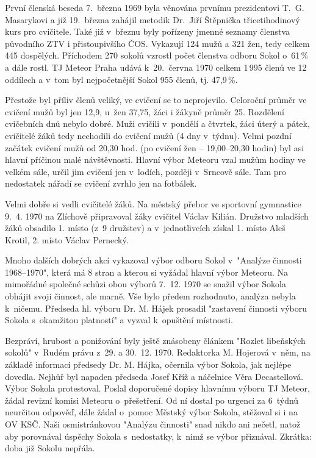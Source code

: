 \documentclass[a5paper, 11pt, twoside]{article}
\begin{document}
\smallskip

První členská beseda 7.~března 1969 byla věnována prvnímu prezidentovi
T.~G. Masarykovi a již 19.~března zahájil metodik Dr.~Jiří Štěpnička
třicetihodinový kurs pro cvičitele. Také již v~březnu byly pořízeny
jmenné seznamy členstva původního ZTV i přistoupivšího ČOS. Vykazují 124
mužů a 321 žen, tedy celkem 445 dospělých. Příchodem 270 sokolů vzrostl
počet členstva odboru Sokol o~61\,\% a dále rostl. TJ Meteor Praha udává
k~20.~června 1970 celkem 1\,995 členů ve 12 oddílech a v~tom byl
nejpočetnější Sokol 955 členů, tj. 47,9\,\%.

Přestože byl příliv členů veliký, ve cvičení se to neprojevilo.
Celoroční průměr ve cvičení mužů byl jen 12,9, u~žen 37,75, žáci i
žákyně průměr 25. Rozdělení cvičebních dnů nebylo dobré. Muži cvičili
v~pondělí a čtvrtek, žáci úterý a pátek, cvičitelé žáků tedy nechodili do
cvičení mužů (4 dny v~týdnu). Velmi pozdní začátek cvičení mužů od 20,30
hod. (po cvičení žen --⁠⁠⁠⁠⁠⁠ 19,00--⁠⁠⁠⁠⁠⁠20,30 hodin) byl asi hlavní příčinou malé
návštěvnosti. Hlavní výbor Meteoru vzal mužům hodiny ve velkém sále,
určil jim cvičení jen v~lodích, později v~Srncově sále. Tam pro
nedostatek nářadí se cvičení zvrhlo jen na fotbálek.

Velmi dobře si vedli cvičitelé žáků. Na městský přebor ve sportovní
gymnastice 9.~4. 1970 na Zlíchově připravoval žáky cvičitel Václav
Kilián. Družstvo mladších žáků obsadilo 1. místo (z~9 družstev) a
v~jednotlivcích získal 1. místo Aleš Krotil, 2. místo Václav Pernecký.

Mnoho dalších dobrých akcí vykazoval výbor odboru Sokol v~"Analýze
činnosti 1968--1970", která má 8 stran a kterou si vyžádal hlavní výbor
Meteoru. Na mimořádné společné schůzi obou výborů 7.~12. 1970 se snažil
výbor Sokola obhájit svoji činnost, ale marně. Vše bylo předem
rozhodnuto, analýza nebyla k~ničemu. Předseda hl. výboru Dr. M. Hájek
prosadil "zastavení činnosti výboru Sokola s~okamžitou platností" a
vyzval k~opuštění místnosti.

Bezpráví, hrubost a ponižování byly ještě znásobeny článkem "Rozlet
libeňských sokolů" v~Rudém právu z~29. a 30.~12. 1970. Redaktorka M.
Hojerová v~něm, na základě informací předsedy Dr. M. Hájka, očernila
výbor Sokola, jak nejlépe dovedla. Nejhůř byl napaden předseda Josef
Kříž a náčelnice Věra Decastellová. Výbor Sokola protestoval. Poslal
doporučené dopisy hlavnímu výboru TJ Meteor, žádal revizní komisi
Meteoru o~přešetření. Od ní dostal po urgenci za 6~týdnů neurčitou
odpověď, dále žádal o~pomoc Městský výbor Sokola, stěžoval si i na OV
KSČ. Naši osmistránkovou "Analýzu činnosti" snad nikdo ani nečetl,
natož aby porovnával úspěchy Sokola s~nedostatky, k~nimž se výbor
přiznával. Zkrátka: doba již Sokolu nepřála.
\end{document}
